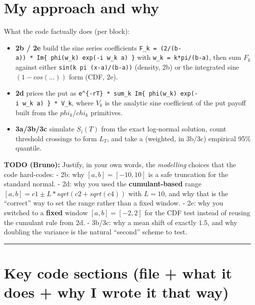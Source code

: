 \documentclass[
  11pt,
]{article}
\providecommand{\tightlist}{%
  \setlength{\itemsep}{0pt}\setlength{\parskip}{0pt}}
\begin{document}
\hypertarget{my-approach-and-why}{%
\section{My approach and why}\label{my-approach-and-why}}

What the code factually does (per block):

\begin{itemize}
\tightlist
\item
  \textbf{2b / 2e} build the sine series coefficients
  \texttt{F\_k\ =\ (2/(b-a))\ *\ Im\{\ phi(w\_k)\ exp(-i\ w\_k\ a)\ \}}
  with \texttt{w\_k\ =\ k*pi/(b-a)}, then sum \(F_k\) against either
  \texttt{sin(k\ pi\ (x-a)/(b-a))} (density, 2b) or the integrated sine
  \((1 - cos(...))\) form (CDF, 2e).
\item
  \textbf{2d} prices the put as
  \texttt{e\^{}\{-rT\}\ *\ sum\_k\ Im\{\ phi(w\_k)\ exp(-i\ w\_k\ a)\ \}\ *\ V\_k},
  where \(V_k\) is the analytic sine coefficient of the put payoff built
  from the \(phi_k\)/\(chi_k\) primitives.
\item
  \textbf{3a/3b/3c} simulate \(S_i(T)\) from the exact log-normal
  solution, count threshold crossings to form \(L_T\), and take a
  (weighted, in 3b/3c) empirical 95\% quantile.
\end{itemize}

\textbf{TODO (Bruno):} Justify, in your own words, the \emph{modelling}
choices that the code hard-codes: - 2b: why \([a,b] = [-10, 10]\) is a
safe truncation for the standard normal. - 2d: why you used the
\textbf{cumulant-based} range \([a,b] = c1 ± L*sqrt(c2 + sqrt(c4))\)
with \(L=10\), and why that is the ``correct'' way to set the range
rather than a fixed window. - 2e: why you switched to a \textbf{fixed}
window \([a,b] = [-2, 2]\) for the CDF test instead of reusing the
cumulant rule from 2d. - 3b/3c: why a mean shift of exactly \(1.5\), and
why doubling the variance is the natural ``second'' scheme to test.

\begin{center}\rule{0.5\linewidth}{0.5pt}\end{center}

\hypertarget{key-code-sections-file-what-it-does-why-i-wrote-it-that-way}{%
\section{Key code sections (file + what it does + why I wrote it that
way)}\label{key-code-sections-file-what-it-does-why-i-wrote-it-that-way}}
\end{document}
